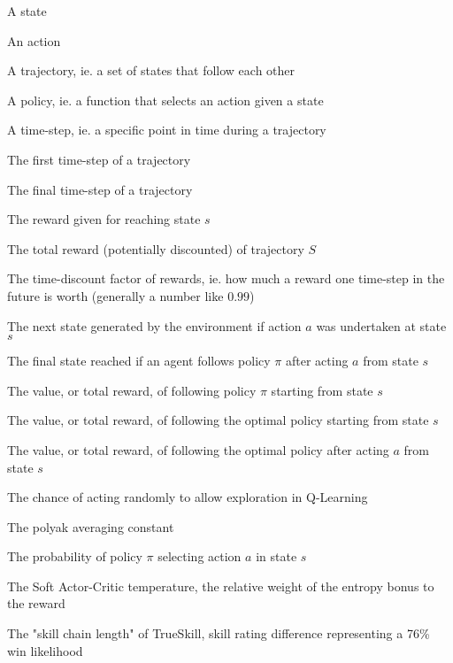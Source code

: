 \begin{description}[style=sameline,leftmargin=3cm,font=\normalfont]
  \item[$s$] A state\\
  \item[$a$] An action\\
  \item[$S$] A trajectory, ie. a set of states that follow each other\\
  \item[$\pi$] A policy, ie. a function that selects an action given a state\\
  \item[$t$] A time-step, ie. a specific point in time during a trajectory\\
  \item[$t_0$] The first time-step of a trajectory\\
  \item[$t_{end}$] The final time-step of a trajectory\\
  \item[$r(s)$] The reward given for reaching state $s$\\
  \item[$R(S)$] The total reward (potentially discounted) of trajectory $S$\\
  \item[$\gamma$] The time-discount factor of rewards, ie. how much a reward one time-step in the future is worth (generally a number like $0.99$)\\
  \item[$Env(s, a)$] The next state generated by the environment if action $a$ was undertaken at state $s$\\
  \item[$Term_{\pi}(s, a)$] The final state reached if an agent follows policy $\pi$ after acting $a$ from state $s$\\
  \item[$V_{\pi}(s)$] The value, or total reward, of following policy $\pi$ starting from state $s$\\
  \item[$V^*(s)$] The value, or total reward, of following the optimal policy starting from state $s$\\
  \item[$Q^*(s, a)$] The value, or total reward, of following the optimal policy after acting $a$ from state $s$\\
  \item[$\epsilon$] The chance of acting randomly to allow exploration in Q-Learning\\
  \item[$\psi$] The polyak averaging constant\\
  \item[$P_{\pi, s}(a)$] The probability of policy $\pi$ selecting action $a$ in state $s$\\
  \item[$\alpha$] The Soft Actor-Critic temperature, the relative weight of the entropy bonus to the reward\\
  \item[$\beta$] The "skill chain length" of TrueSkill, skill rating difference representing a 76\% win likelihood
\end{description}
